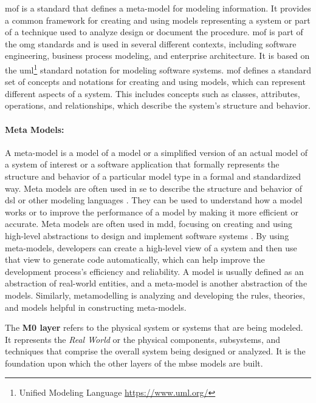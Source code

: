 \ac{mof} is a standard that defines a meta-model for modeling information. 
It provides a common framework for creating and using models representing a system or part of a technique used to analyze design or document the procedure.
\ac{mof} is part of the \ac{omg} \cite{misc:mbse:mof} standards and is used in several different contexts, including software engineering, business process modeling, and enterprise architecture. 
It is based on the \ac{uml}\footnote{Unified Modeling Language \url{https://www.uml.org/}} standard notation for modeling software systems.
\ac{mof} defines a standard set of concepts and notations for creating and using models, which can represent different aspects of a system. 
This includes concepts such as classes, attributes, operations, and relationships, which describe the system's structure and behavior.

\paragraph{Meta Models:} 
A meta-model is a model of a model or a simplified version of an actual model of a system of interest or a software application that formally represents the structure and behavior of a particular model type in a formal and standardized way.
Meta models are often used in \ac{se} to describe the structure and behavior of \ac{dsl} or other modeling languages \cite{misc:metamodels:dsl}.
They can be used to understand how a model works or to improve the performance of a model by making it more efficient or accurate. 
Meta models are often used in \ac{mdd}, focusing on creating and using high-level abstractions to design and implement software systems \cite{misc:metamodels:mdd}. 
By using meta-models, developers can create a high-level view of a system and then use that view to generate code automatically, which can help improve the development process's efficiency and reliability.
A model is usually defined as an abstraction of real-world entities, and a meta-model is another abstraction of the models. 
Similarly, metamodelling is analyzing and developing the rules, theories, and models helpful in constructing meta-models.

The \textbf{M0 layer} refers to the physical system or systems that are being modeled. 
It represents the \textit{Real World} or the physical components, subsystems, and techniques that comprise the overall system being designed or analyzed. 
It is the foundation upon which the other layers of the \ac{mbse} models are built.

